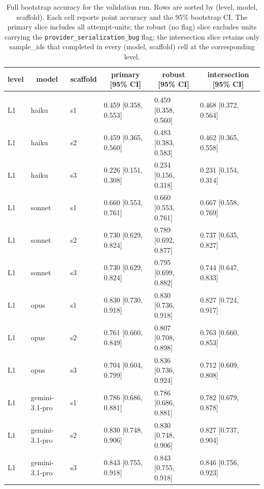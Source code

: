 \documentclass[10pt]{article} %
\begin{document}
    \begin{table}[t]
        \caption{Full bootstrap accuracy for the validation run. Rows are sorted by (level, model, scaffold). Each cell reports point accuracy and the 95\% bootstrap CI. The primary slice includes all attempt-units; the robust (no flag) slice excludes units carrying the \texttt{provider\_serialization\_bug} flag; the intersection slice retains only sample\_ids that completed in every (model, scaffold) cell at the corresponding level.}
    \label{tab:bootstrap_accuracy_full}
    \begin{center}
    \small
    \begin{tabular}{llllll}
    \multicolumn{1}{c}{\bf level} & \multicolumn{1}{c}{\bf model} & \multicolumn{1}{c}{\bf scaffold} & \multicolumn{1}{c}{\bf primary [95\% CI]} & \multicolumn{1}{c}{\bf robust [95\% CI]} & \multicolumn{1}{c}{\bf intersection [95\% CI]} \\
        \hline \\
        L1 & haiku & s1 & 0.459 [0.358, 0.553] & 0.459 [0.358, 0.560] & 0.468 [0.372, 0.564] \\
        L1 & haiku & s2 & 0.459 [0.365, 0.560] & 0.483 [0.383, 0.583] & 0.462 [0.365, 0.558] \\
        L1 & haiku & s3 & 0.226 [0.151, 0.308] & 0.234 [0.156, 0.318] & 0.231 [0.154, 0.314] \\
        L1 & sonnet & s1 & 0.660 [0.553, 0.761] & 0.660 [0.553, 0.761] & 0.667 [0.558, 0.769] \\
        L1 & sonnet & s2 & 0.730 [0.629, 0.824] & 0.789 [0.692, 0.877] & 0.737 [0.635, 0.827] \\
        L1 & sonnet & s3 & 0.730 [0.629, 0.824] & 0.795 [0.699, 0.882] & 0.744 [0.647, 0.833] \\
        L1 & opus & s1 & 0.830 [0.730, 0.918] & 0.830 [0.736, 0.918] & 0.827 [0.724, 0.917] \\
        L1 & opus & s2 & 0.761 [0.660, 0.849] & 0.807 [0.708, 0.898] & 0.763 [0.660, 0.853] \\
        L1 & opus & s3 & 0.704 [0.604, 0.799] & 0.836 [0.736, 0.924] & 0.712 [0.609, 0.808] \\
        L1 & gemini-3.1-pro & s1 & 0.786 [0.686, 0.881] & 0.786 [0.686, 0.881] & 0.782 [0.679, 0.878] \\
        L1 & gemini-3.1-pro & s2 & 0.830 [0.748, 0.906] & 0.830 [0.748, 0.906] & 0.827 [0.737, 0.904] \\
        L1 & gemini-3.1-pro & s3 & 0.843 [0.755, 0.918] & 0.843 [0.755, 0.918] & 0.846 [0.756, 0.923] \\

\end{tabular}
\end{center}
\end{table}
\end{document}
